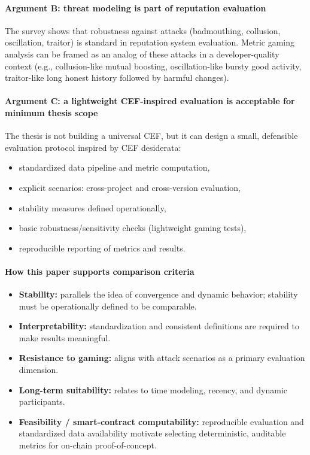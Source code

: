 \documentclass[11pt,a4paper]{article}
\begin{document}
\paragraph{Argument B: threat modeling is part of reputation evaluation}
The survey shows that robustness against attacks (badmouthing, collusion, oscillation, traitor) is standard in reputation system evaluation. Metric gaming analysis can be framed as an analog of these attacks in a developer-quality context (e.g., collusion-like mutual boosting, oscillation-like bursty good activity, traitor-like long honest history followed by harmful changes).

\paragraph{Argument C: a lightweight CEF-inspired evaluation is acceptable for minimum thesis scope}
The thesis is not building a universal CEF, but it can design a small, defensible evaluation protocol inspired by CEF desiderata:
\begin{itemize}[leftmargin=*]
  \item standardized data pipeline and metric computation,
  \item explicit scenarios: cross-project and cross-version evaluation,
  \item stability measures defined operationally,
  \item basic robustness/sensitivity checks (lightweight gaming tests),
  \item reproducible reporting of metrics and results.
\end{itemize}

\paragraph{How this paper supports comparison criteria}
\begin{itemize}[leftmargin=*]
  \item \textbf{Stability:} parallels the idea of convergence and dynamic behavior; stability must be operationally defined to be comparable.
  \item \textbf{Interpretability:} standardization and consistent definitions are required to make results meaningful.
  \item \textbf{Resistance to gaming:} aligns with attack scenarios as a primary evaluation dimension.
  \item \textbf{Long-term suitability:} relates to time modeling, recency, and dynamic participants.
  \item \textbf{Feasibility / smart-contract computability:} reproducible evaluation and standardized data availability motivate selecting deterministic, auditable metrics for on-chain proof-of-concept.
\end{itemize}
\end{document}
